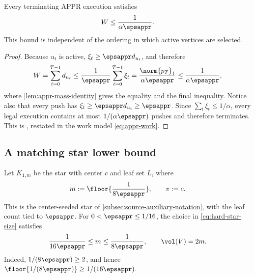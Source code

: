 \begin{proposition}
\label{prop:appr-upper-bound}
Every terminating APPR execution satisfies
\begin{equation}
    W\leq\frac{1}{\alpha\epsappr}.
    \label{eq:appr-upper-bound}
\end{equation}
This bound is independent of the ordering in which active vertices are
selected.
\end{proposition}

\begin{proof}
Because \(u_t\) is active, \(\xi_t\geq\epsappr d_{u_t}\), and therefore
\begin{equation}
    W
    =\sum_{t=0}^{T-1}d_{u_t}
    \leq\frac{1}{\epsappr}\sum_{t=0}^{T-1}\xi_t
    =\frac{\norm{p_T}_1}{\alpha\epsappr}
    \leq\frac{1}{\alpha\epsappr},
    \label{eq:appr-upper-bound-proof}
\end{equation}
where \cref{lem:appr-mass-identity} gives the equality and the final
inequality. Notice also that every push has
\(\xi_t\geq\epsappr d_{u_t}\geq\epsappr\). Since
\(\sum_t\xi_t\leq1/\alpha\), every legal execution contains at most
\(1/(\alpha\epsappr)\) pushes and therefore terminates. This is
\citet[Equation~(3.3)]{andersen2007using}, restated in the work model
\cref{eq:appr-work}.
\end{proof}

\subsection{A matching star lower bound}
\label{subsec:appr-star-lower-bound}

Let \(K_{1,m}\) be the star with center \(c\) and leaf set \(L\), where
\begin{equation}
    m:=\floor{\frac{1}{8\epsappr}},
    \qquad
    v:=c.
    \label{eq:hard-star-size}
\end{equation}
This is the center-seeded star of \cref{subsec:source-auxiliary-notation}, with
the leaf count tied to \(\epsappr\). For \(0<\epsappr\leq1/16\), the choice in
\cref{eq:hard-star-size} satisfies
\begin{equation}
    \frac{1}{16\epsappr}\leq m\leq\frac{1}{8\epsappr},
    \qquad
    \vol(V)=2m.
    \label{eq:hard-star-size-bounds}
\end{equation}
Indeed, \(1/(8\epsappr)\geq2\), and hence
\(\floor{1/(8\epsappr)}\geq1/(16\epsappr)\).

